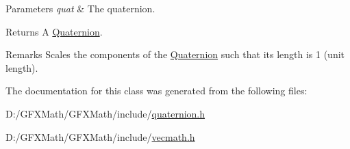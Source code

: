 \begin{DoxyParams}{Parameters}
{\em quat} & The quaternion.\\
\hline
\end{DoxyParams}
\begin{DoxyReturn}{Returns}
A \hyperlink{classgfxmath_1_1_quaternion}{Quaternion}.
\end{DoxyReturn}
\begin{DoxyRemark}{Remarks}
Scales the components of the \hyperlink{classgfxmath_1_1_quaternion}{Quaternion} such that its length is 1 (unit length). 
\end{DoxyRemark}


The documentation for this class was generated from the following files\+:\begin{DoxyCompactItemize}
\item 
D\+:/\+G\+F\+X\+Math/\+G\+F\+X\+Math/include/\hyperlink{quaternion_8h}{quaternion.\+h}\item 
D\+:/\+G\+F\+X\+Math/\+G\+F\+X\+Math/include/\hyperlink{vecmath_8h}{vecmath.\+h}\end{DoxyCompactItemize}
